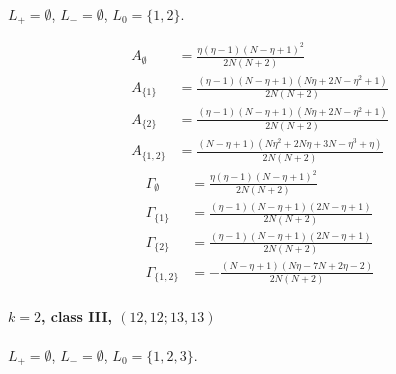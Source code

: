 \documentclass[11pt]{article}
\begin{document}
$L_+=\emptyset$, $L_-=\emptyset$, $L_0=\{1,2\}$.

\begin{align*}
  A_{\emptyset} &= \frac{\eta \left(\eta - 1\right) \left(N - \eta + 1\right)^{2}}{2 N \left(N + 2\right)} \\
  A_{\{1\}} &= \frac{\left(\eta - 1\right) \left(N - \eta + 1\right) \left(N \eta + 2 N - \eta^{2} + 1\right)}{2 N \left(N + 2\right)} \\
  A_{\{2\}} &= \frac{\left(\eta - 1\right) \left(N - \eta + 1\right) \left(N \eta + 2 N - \eta^{2} + 1\right)}{2 N \left(N + 2\right)} \\
  A_{\{1,2\}} &= \frac{\left(N - \eta + 1\right) \left(N \eta^{2} + 2 N \eta + 3 N - \eta^{3} + \eta\right)}{2 N \left(N + 2\right)} 
\end{align*}
\begin{align*}
  \Gamma_{\emptyset} &= \frac{\eta \left(\eta - 1\right) \left(N - \eta + 1\right)^{2}}{2 N \left(N + 2\right)} \\
  \Gamma_{\{1\}} &= \frac{\left(\eta - 1\right) \left(N - \eta + 1\right) \left(2 N - \eta + 1\right)}{2 N \left(N + 2\right)} \\
  \Gamma_{\{2\}} &= \frac{\left(\eta - 1\right) \left(N - \eta + 1\right) \left(2 N - \eta + 1\right)}{2 N \left(N + 2\right)} \\
  \Gamma_{\{1,2\}} &= - \frac{\left(N - \eta + 1\right) \left(N \eta - 7 N + 2 \eta - 2\right)}{2 N \left(N + 2\right)} 
\end{align*}

\paragraph{$k=2$, class III, $(12,12;13,13)$}

$L_+=\emptyset$, $L_-=\emptyset$, $L_0=\{1,2,3\}$.
\end{document}
